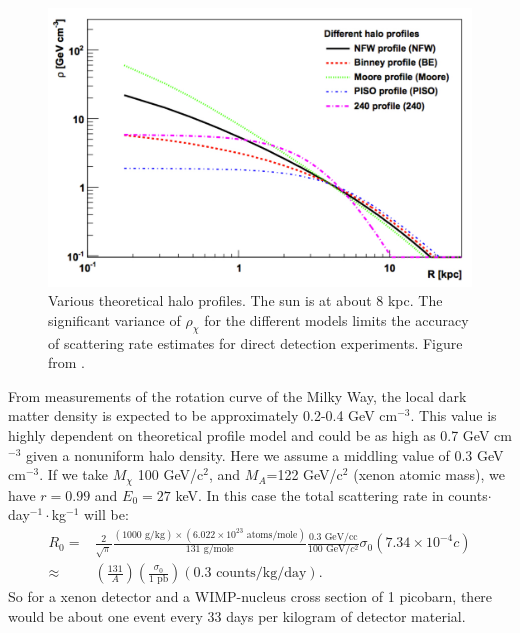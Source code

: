 \begin{figure}[h!]
\centering
\includegraphics[width=150mm]{Figures/DMprofiles.pdf}
\caption{Various theoretical halo profiles. The sun is at about 8 kpc. The significant variance of $\rho_{\chi}$ for the different models limits the accuracy of scattering rate estimates for direct detection experiments. Figure from \cite{weber}.}
\label{fig:WIMPprofiles} 
\end{figure}
From measurements of the rotation curve of the Milky Way, the local dark matter density is expected to be approximately 0.2-0.4 GeV cm$^{-3}$. This value is highly dependent on theoretical profile model and could be as high as 0.7 GeV cm$^{-3}$ given a nonuniform halo density\cite{weber}. Here we assume a middling value of 0.3 GeV cm$^{-3}$. If we take $M_{\chi}$ 100 GeV/c$^2$, and $M_A$=122 GeV/c$^2$ (xenon atomic mass), we have $r=0.99$ and $E_0=27$ keV. In this case the total scattering rate in counts$\cdot$ day$^{-1}\cdot$kg$^{-1}$ will be:
\begin{equation}
\begin{split}
R_0=& \frac{2}{\sqrt{\pi}}\frac{(1000 \text{\ g/kg})\times (6.022\times 10^{23}\text{\ atoms/mole})}{131 \text{\ g/mole}}\frac{0.3 \text{\ GeV/cc}}{100 \text{\ GeV}/c^2}\sigma_0 (7.34 \times 10^{-4}c)\\
\approx&\left( \frac{131}{A} \right)\left( \frac{\sigma_0}{1 \text{\ pb}} \right)(0.3 \text{\ counts/kg/day}).
\end{split}
\end{equation}
So for a xenon detector and a WIMP-nucleus cross section of 1 picobarn, there would be about one event every 33 days per kilogram of detector material.

